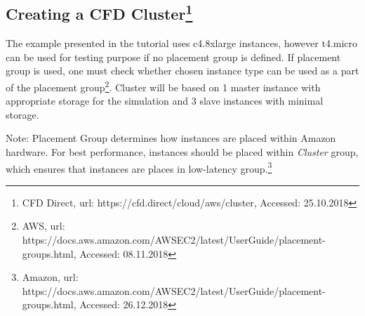 \documentclass[12pt,english]{article}
\begin{document}
\subsection{\label{Creating a CFD Cluster}Creating a CFD Cluster\footnote{CFD Direct, url: https://cfd.direct/cloud/aws/cluster, Accessed: 25.10.2018}}

The example presented in the tutorial uses c4.8xlarge instances, however t4.micro can be used for testing purpose if no placement group is defined. If placement group is used, one must check whether chosen instance type can be used as a part of the placement group\footnote{AWS, url: https://docs.aws.amazon.com/AWSEC2/latest/UserGuide/placement-groups.html, Accessed: 08.11.2018}. Cluster will be based on 1 master instance with appropriate storage for the simulation and 3 slave instances with minimal storage.

Note: Placement Group determines how instances are placed within Amazon hardware. For best performance, instances should be placed within \textit{Cluster} group, which ensures that instances are places in low-latency group.\footnote{Amazon, url: https://docs.aws.amazon.com/AWSEC2/latest/UserGuide/placement-groups.html, Accessed: 26.12.2018}
\end{document}
